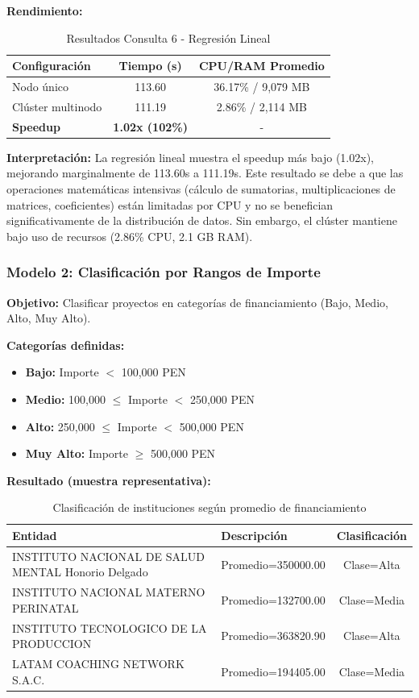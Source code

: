 \documentclass[12pt,a4paper]{article}
\begin{document}
\textbf{Rendimiento:}

\begin{table}[H]
\centering
\begin{tabular}{lcc}
\toprule
\textbf{Configuración} & \textbf{Tiempo (s)} & \textbf{CPU/RAM Promedio} \\
\midrule
Nodo único & 113.60 & 36.17\% / 9,079 MB \\
Clúster multinodo & 111.19 & 2.86\% / 2,114 MB \\
\midrule
\textbf{Speedup} & \textbf{1.02x (102\%)} & - \\
\bottomrule
\end{tabular}
\caption{Resultados Consulta 6 - Regresión Lineal}
\label{tab:regresion_perf}
\end{table}

\textbf{Interpretación:} La regresión lineal muestra el speedup más bajo (1.02x), mejorando marginalmente de 113.60s a 111.19s. Este resultado se debe a que las operaciones matemáticas intensivas (cálculo de sumatorias, multiplicaciones de matrices, coeficientes) están limitadas por CPU y no se benefician significativamente de la distribución de datos. Sin embargo, el clúster mantiene bajo uso de recursos (2.86\% CPU, 2.1 GB RAM).

\subsubsection{Modelo 2: Clasificación por Rangos de Importe}

\textbf{Objetivo:} Clasificar proyectos en categorías de financiamiento (Bajo, Medio, Alto, Muy Alto).

\textbf{Categorías definidas:}
\begin{itemize}
    \item \textbf{Bajo:} Importe $<$ 100,000 PEN
    \item \textbf{Medio:} 100,000 $\leq$ Importe $<$ 250,000 PEN
    \item \textbf{Alto:} 250,000 $\leq$ Importe $<$ 500,000 PEN
    \item \textbf{Muy Alto:} Importe $\geq$ 500,000 PEN
\end{itemize}

\textbf{Resultado (muestra representativa):}

\begin{table}[H]
\centering
\begin{tabular}{lp{7cm}c}
\toprule
\textbf{Entidad} & \textbf{Descripción} & \textbf{Clasificación} \\
\midrule
INSTITUTO NACIONAL DE SALUD MENTAL Honorio Delgado & Promedio=350000.00 & Clase=Alta \\
INSTITUTO NACIONAL MATERNO PERINATAL & Promedio=132700.00 & Clase=Media \\
INSTITUTO TECNOLOGICO DE LA PRODUCCION & Promedio=363820.90 & Clase=Alta \\
LATAM COACHING NETWORK S.A.C. & Promedio=194405.00 & Clase=Media \\
\bottomrule
\end{tabular}
\caption{Clasificación de instituciones según promedio de financiamiento}
\label{tab:clasificacion}
\end{table}
\end{document}
